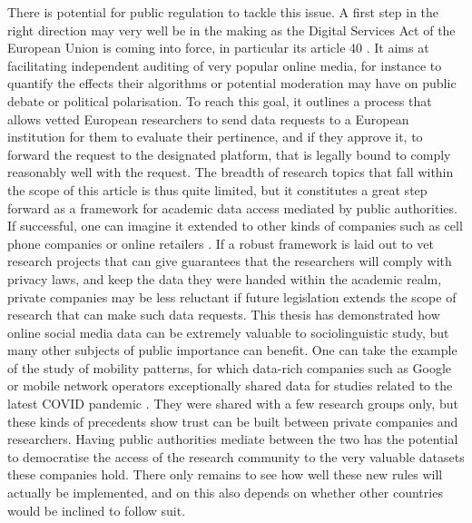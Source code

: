 \documentclass[../thesis.tex]{subfiles}
\begin{document}
There is potential for public regulation to tackle this issue. A first step in the right
direction may very well be in the making as the Digital Services Act of the European
Union is coming into force, in particular its article 40 \cite{DigitalServices2022}. It
aims at facilitating independent auditing of very popular online media, for instance to
quantify the effects their algorithms or potential moderation may have on public debate
or political polarisation. To reach this goal, it outlines a process that allows vetted
European researchers to send data requests to a European institution for them to
evaluate their pertinence, and if they approve it, to forward the request to the
designated platform, that is legally bound to comply reasonably well with the request.
The breadth of research topics that fall within the scope of this article is thus quite limited,
but it constitutes a great step forward as a framework for academic data access mediated
by public authorities. If successful, one can imagine it extended to other kinds of
companies such as cell phone companies or online retailers
\cite{PersilyProposalResearcher2021}. If a robust framework is laid out to vet research
projects that can give guarantees that the researchers will comply with privacy laws,
and keep the data they were handed within the academic realm, private companies may be
less reluctant if future legislation extends the scope of research that can make such
data requests. This thesis has demonstrated how online social media data can be
extremely valuable to sociolinguistic study, but many other subjects of public
importance can benefit. One can take the example of the study of mobility patterns, for
which data-rich companies such as Google or mobile network operators exceptionally
shared data for studies related to the latest COVID pandemic
\cite{AguilarImpactUrban2022,GozziEstimatingEffect2021}. They were shared with a few
research groups only, but these kinds of precedents show trust can be built between
private companies and researchers. Having public authorities mediate between the two has
the potential to democratise the access of the research community to the very valuable
datasets these companies hold. There only remains to see how well these new rules will
actually be implemented, and on this also depends on whether other countries would be
inclined to follow suit.

\end{document}
